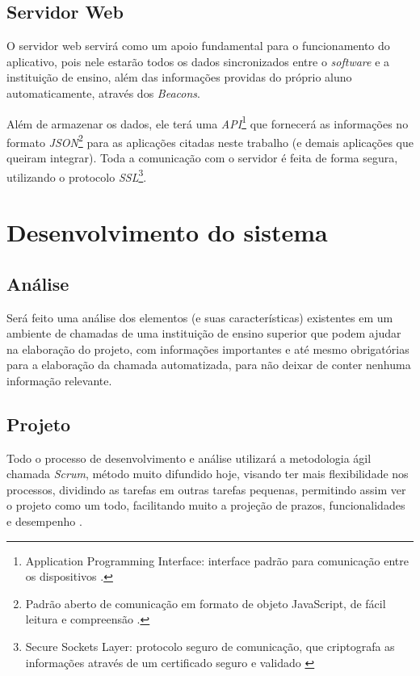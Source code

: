 \documentclass[
	12pt,
	oneside,
	a4paper,
	english,
	brazil,
]{abntex2}
\begin{document}
\subsection{Servidor Web}

O servidor web servirá como um apoio fundamental para o funcionamento do aplicativo, pois nele estarão todos os dados sincronizados entre o \emph{software} e a instituição de ensino, além das informações providas do próprio aluno automaticamente, através dos \emph{Beacons}.

Além de armazenar os dados, ele terá uma \emph{API}\footnote{Application Programming Interface: interface padrão para comunicação entre os dispositivos \cite{footnote-api}.} que fornecerá as informações no formato \emph{JSON}\footnote{Padrão aberto de comunicação em formato de objeto JavaScript, de fácil leitura e compreensão \cite{footnote-json}.} para as aplicações citadas neste trabalho (e demais aplicações que queiram integrar). Toda a comunicação com o servidor é feita de forma segura, utilizando o protocolo \emph{SSL}\footnote{Secure Sockets Layer: protocolo seguro de comunicação, que criptografa as informações através de um certificado seguro e validado \cite{footnote-ssl}}. 

\section{Desenvolvimento do sistema}
\subsection{Análise}

Será feito uma análise dos elementos (e suas características) existentes em um ambiente de chamadas de uma instituição de ensino superior que podem ajudar na elaboração do projeto, com informações importantes e até mesmo obrigatórias para a elaboração da chamada automatizada, para não deixar de conter nenhuma informação relevante.

\subsection{Projeto}

Todo o processo de desenvolvimento e análise utilizará a metodologia ágil chamada \emph{Scrum}, método muito difundido hoje, visando ter mais flexibilidade nos processos, dividindo as tarefas em outras tarefas pequenas, permitindo assim ver o projeto como um todo, facilitando muito a projeção de prazos, funcionalidades e desempenho \cite{scrum}.
\end{document}
